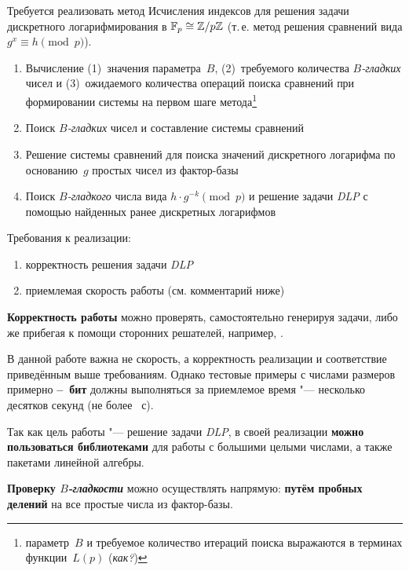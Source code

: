 \documentclass{ca-capstone}
\begin{document}


\goal
Требуется реализовать метод Исчисления индексов для решения задачи дискретного
логарифмирования в $\mathbb{F}_{p} \cong \mathbb{Z}/p\mathbb{Z}$ (т.\,е. метод решения сравнений вида
$g^x \equiv h \pmod{p}$).

\functionality
\begin{enumerate}
  \item Вычисление (1)~значения параметра~$B$, (2)~требуемого количества \emph{$B$-гладких}
    чисел и (3)~ожидаемого количества операций поиска сравнений при формировании системы на
    первом шаге метода\footnote{параметр~$B$ и требуемое количество итераций поиска
    выражаются в терминах функции~$L(p)$ (\emph{как?})}
  \item Поиск \emph{$B$-гладких} чисел и составление системы сравнений
  \item Решение системы сравнений для поиска значений дискретного логарифма по основанию~$g$
    простых чисел из фактор-базы
  \item Поиск \emph{$B$-гладкого} числа вида $h \cdot g^{-k} \pmod{p}$ и решение задачи
    \emph{DLP} с помощью найденных ранее дискретных логарифмов
\end{enumerate}

\requirements
Требования к реализации:
\begin{enumerate}
  \item корректность решения задачи \emph{DLP}
  \item приемлемая скорость работы (см. комментарий ниже)
\end{enumerate}

\textbf{Корректность работы} можно проверять, самостоятельно генерируя задачи, либо же
прибегая к помощи сторонних решателей, например, \cite{alpertron-dilog,sagemath}.

В данной работе важна не скорость, а корректность реализации и соответствие приведённым выше
требованиям. Однако тестовые примеры с числами размеров примерно
\textbf{\ReqBitsMin--\ReqBitsMax~бит} должны выполняться за приемлемое время "--- несколько
десятков секунд (не более \ReqSeconds~с).

\details
Так как цель работы "--- решение задачи \emph{DLP}, в своей реализации \textbf{можно
пользоваться библиотеками} для работы с большими целыми числами, а также пакетами линейной
алгебры.

\textbf{Проверку \emph{$B$-гладкости}} можно осуществлять напрямую: \textbf{путём пробных
делений} на все простые числа из фактор-базы.
\end{document}
